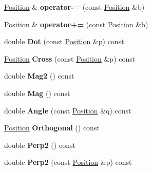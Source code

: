 \begin{DoxyCompactItemize}
\item 
\hypertarget{classPosition_a2d414d082486e40bef80c1ae3f3d05e7}{
\hyperlink{classPosition}{Position} \& {\bfseries operator-\/=} (const \hyperlink{classPosition}{Position} \&b)}
\label{classPosition_a2d414d082486e40bef80c1ae3f3d05e7}

\item 
\hypertarget{classPosition_ad2bd309438b9410f3e02b01f6d3db5bc}{
\hyperlink{classPosition}{Position} \& {\bfseries operator+=} (const \hyperlink{classPosition}{Position} \&b)}
\label{classPosition_ad2bd309438b9410f3e02b01f6d3db5bc}

\item 
\hypertarget{classPosition_a7b9b6ac6629131398f2928360f20eb08}{
double {\bfseries Dot} (const \hyperlink{classPosition}{Position} \&p) const }
\label{classPosition_a7b9b6ac6629131398f2928360f20eb08}

\item 
\hypertarget{classPosition_ad00bec35610db4f6955a473e24fb7cbb}{
\hyperlink{classPosition}{Position} {\bfseries Cross} (const \hyperlink{classPosition}{Position} \&p) const }
\label{classPosition_ad00bec35610db4f6955a473e24fb7cbb}

\item 
\hypertarget{classPosition_a03df8eb4c0cc7c341a5424f622faa655}{
double {\bfseries Mag2} () const }
\label{classPosition_a03df8eb4c0cc7c341a5424f622faa655}

\item 
\hypertarget{classPosition_a5166f113ddb9e5f116ac4e3f6bd638c5}{
double {\bfseries Mag} () const }
\label{classPosition_a5166f113ddb9e5f116ac4e3f6bd638c5}

\item 
\hypertarget{classPosition_a3140c87b9934338c610c39b8fd300384}{
double {\bfseries Angle} (const \hyperlink{classPosition}{Position} \&q) const }
\label{classPosition_a3140c87b9934338c610c39b8fd300384}

\item 
\hypertarget{classPosition_afea0aaa9328d8831f89fc491a3fe1cdc}{
\hyperlink{classPosition}{Position} {\bfseries Orthogonal} () const }
\label{classPosition_afea0aaa9328d8831f89fc491a3fe1cdc}

\item 
\hypertarget{classPosition_ac343878fec78550e928730f27b11cd39}{
double {\bfseries Perp2} () const }
\label{classPosition_ac343878fec78550e928730f27b11cd39}

\item 
\hypertarget{classPosition_aea7d37f6f8c91f121bd3b814ed0a057f}{
double {\bfseries Perp2} (const \hyperlink{classPosition}{Position} \&p) const }
\label{classPosition_aea7d37f6f8c91f121bd3b814ed0a057f}

\end{DoxyCompactItemize}
